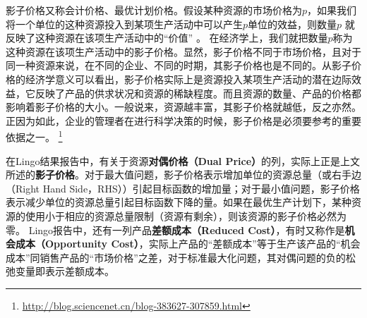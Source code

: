影子价格又称会计价格、最优计划价格。假设某种资源的市场价格为$p$，如果我们将一个单位的这种资源投入到某项生产活动中可以产生$p$单位的效益，则数量$p$ 就反映了这种资源在该项生产活动中的“价值” 。 在经济学上，我们就把数量$p$称为这种资源在该项生产活动中的影子价格。显然，影子价格不同于市场价格，且对于同一种资源来说，在不同的企业、不同的时期，其影子价格也是不同的。从影子价格的经济学意义可以看出，影子价格实际上是资源投入某项生产活动的潜在边际效益，它反映了产品的供求状况和资源的稀缺程度。而且资源的数量、产品的价格都影响着影子价格的大小。一般说来，资源越丰富，其影子价格就越低，反之亦然。正因为如此，企业的管理者在进行科学决策的时候，影子价格是必须要参考的重要依据之一。
\footnote{\href{http://blog.sciencenet.cn/blog-383627-307859.html}{http://blog.sciencenet.cn/blog-383627-307859.html}}

\begin{remark}
在Lingo结果报告中，有关于资源\textbf{对偶价格（Dual Price）}的列，实际上正是上文所述的\textbf{影子价格}。对于最大值问题，影子价格表示增加单位的资源总量（或右手边（Right Hand Side，RHS））引起目标函数的增加量；对于最小值问题，影子价格表示减少单位的资源总量引起目标函数下降的量。如果在最优生产计划下，某种资源的使用小于相应的资源总量限制（资源有剩余），则该资源的影子价格必然为零。
Lingo报告中，还有一列产品\textbf{差额成本（Reduced Cost）}，有时又称作是\textbf{机会成本（Opportunity Cost）}，实际上产品的“差额成本”等于生产该产品的“机会成本”同销售产品的“市场价格”之差，对于标准最大化问题，其对偶问题的负的松弛变量即表示差额成本。
\end{remark}

